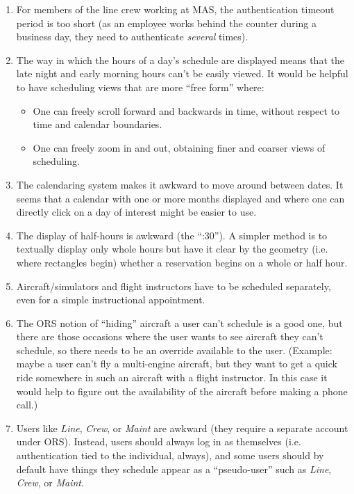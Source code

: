 \documentclass[letterpaper,10pt,titlepage]{article}
\begin{document}
\begin{enumerate}
\item For members of the line crew working at MAS, the authentication timeout
      period is too short (as an employee works behind the counter during a
      business day, they need to authenticate \emph{several} times).
\item The way in which the hours of a day's schedule are displayed means that
      the late night and early morning hours can't be easily viewed.  It would
      be helpful to have scheduling views that are more ``free form'' where:
      \begin{itemize}
      \item One can freely scroll forward and backwards in time, without respect
            to time and calendar boundaries.
      \item One can freely zoom in and out, obtaining finer and coarser views
            of scheduling.
      \end{itemize}
\item The calendaring system makes it awkward to move around between dates.
      It seems that a calendar with one or more months displayed and where one can
      directly click on a day of interest might be easier to use.
\item The display of half-hours is awkward (the ``:30'')\@.  A simpler
      method is to textually display only whole hours but have it clear
      by the geometry (i.e. where rectangles begin) whether a reservation
      begins on a whole or half hour.
\item Aircraft/simulators and flight instructors have to be scheduled separately, even for
      a simple instructional appointment.
\item The ORS notion of ``hiding'' aircraft a user can't schedule is a good one,
      but there are those occasions where the user wants to see aircraft they can't
      schedule, so there needs to be an override available to the user.
      (Example:  maybe a user can't fly a multi-engine aircraft, but they
      want to get a quick ride somewhere in such an aircraft with a flight instructor.
      In this case it would help to figure out the availability of the aircraft
      before making a phone call.)
\item Users like \emph{Line}, \emph{Crew}, or \emph{Maint} are awkward (they require a separate
      account under ORS).  Instead, users should always log in as themselves (i.e.
      authentication tied to the individual, always), and some users should by default have things
      they schedule appear as a ``pseudo-user'' such as \emph{Line}, \emph{Crew}, or \emph{Maint}.

\end{enumerate}
\end{document}
